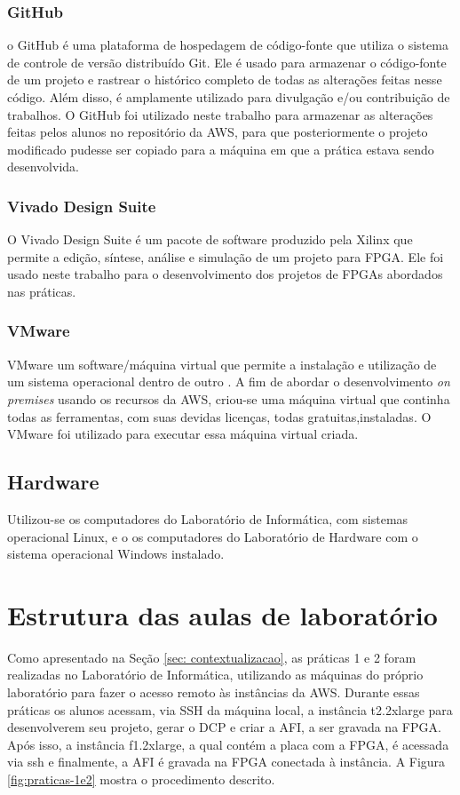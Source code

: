 \subsubsection{GitHub}\label{sec: github}
o GitHub é uma plataforma de hospedagem de código-fonte que  utiliza o sistema de controle de versão distribuído Git. Ele é usado para armazenar o código-fonte de um projeto e rastrear o histórico completo de todas as alterações feitas nesse código. Além disso, é amplamente utilizado para divulgação e/ou contribuição de trabalhos. O GitHub foi utilizado neste trabalho para armazenar as alterações feitas pelos alunos no repositório da AWS, para que posteriormente o projeto modificado pudesse ser copiado para a máquina em que a prática estava sendo desenvolvida.

\subsubsection{Vivado Design Suite}\label{sec: vivado}
O Vivado Design Suite é um pacote de software produzido pela Xilinx que permite a edição, síntese, análise e simulação de um projeto para FPGA. Ele foi usado neste trabalho para o desenvolvimento dos projetos de FPGAs abordados nas práticas.

\subsubsection{VMware}\label{sec: vmware}

VMware um software/máquina virtual que permite a instalação e utilização de um sistema operacional dentro de outro \cite{vmware}. A fim de abordar o desenvolvimento \textit{on premises} usando os recursos da AWS, criou-se uma máquina virtual que continha todas as ferramentas, com suas devidas licenças, todas gratuitas,instaladas. O VMware foi utilizado para executar essa máquina virtual criada.

\subsection{Hardware}\label{sec: Hardware}

Utilizou-se os computadores do Laboratório de Informática, com sistemas operacional Linux, e o os computadores do Laboratório de Hardware com o sistema operacional Windows instalado.


\section{Estrutura das aulas de laboratório}
Como apresentado na Seção \ref{sec: contextualizacao}, as práticas 1 e 2 foram realizadas no Laboratório de Informática, utilizando as máquinas do próprio laboratório para fazer o acesso remoto às instâncias da AWS. Durante essas práticas os alunos acessam, via SSH da máquina local, a instância t2.2xlarge para desenvolverem seu projeto, gerar o DCP e criar a AFI, a ser gravada na FPGA. Após isso, a instância f1.2xlarge, a qual contém a placa com a FPGA, é acessada via ssh e finalmente, a AFI é gravada na FPGA conectada à instância. A Figura \ref{fig:praticas-1e2} mostra o procedimento descrito.

